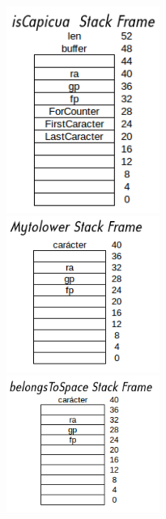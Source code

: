 \documentclass[a4paper,10pt]{article}
\begin{document}
        \includegraphics[width=5cm]{plots/isCapicuaStack.png}\\
        \includegraphics[width=5cm]{plots/mytolowerStack.png}\\
        \includegraphics[width=5cm]{plots/belongsToSpaceStack.png}\\
\end{document}
